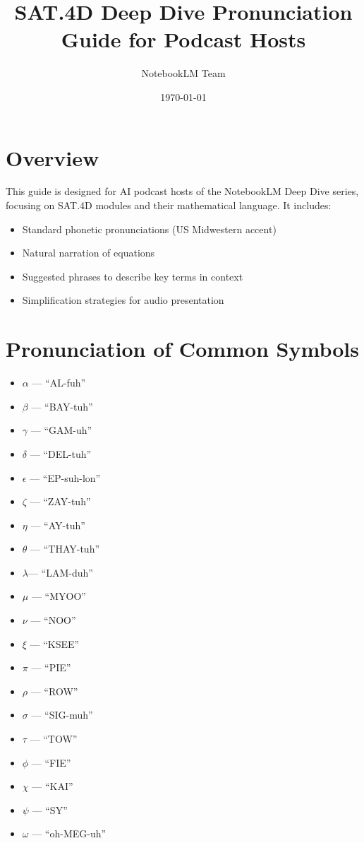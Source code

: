 \documentclass[11pt]{article}
\title{SAT.4D Deep Dive Pronunciation Guide for Podcast Hosts}
\author{NotebookLM Team}
\date{\today}
\begin{document}
\maketitle

\tableofcontents
\newpage

\section{Overview}

This guide is designed for AI podcast hosts of the NotebookLM Deep Dive series, focusing on SAT.4D modules and their mathematical language. It includes:
\begin{itemize}
  \item Standard phonetic pronunciations (US Midwestern accent)
  \item Natural narration of equations
  \item Suggested phrases to describe key terms in context
  \item Simplification strategies for audio presentation
\end{itemize}

\section{Pronunciation of Common Symbols}

\begin{itemize}[leftmargin=*]
  \item $\alpha$ — ``AL-fuh''
  \item $\beta$ — ``BAY-tuh''
  \item $\gamma$ — ``GAM-uh''
  \item $\delta$ — ``DEL-tuh''
  \item $\epsilon$ — ``EP-suh-lon''
  \item $\zeta$ — ``ZAY-tuh''
  \item $\eta$   — ``AY-tuh''
  \item $\theta$ — ``THAY-tuh''
  \item $\lambda$— ``LAM-duh''
  \item $\mu$    — ``MYOO''
  \item $\nu$    — ``NOO''
  \item $\xi$    — ``KSEE''
  \item $\pi$    — ``PIE''
  \item $\rho$   — ``ROW''
  \item $\sigma$ — ``SIG-muh''
  \item $\tau$   — ``TOW''
  \item $\phi$   — ``FIE''
  \item $\chi$   — ``KAI''
  \item $\psi$   — ``SY''
  \item $\omega$ — ``oh-MEG-uh''
\end{itemize}
\end{document}
